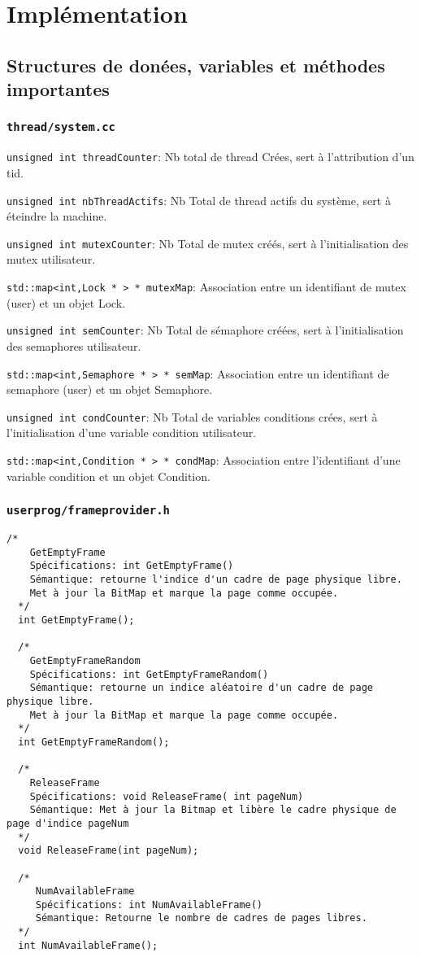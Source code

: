 \documentclass[11pt]{article}
\begin{document}
\section{Implémentation}

\subsection{Structures de donées, variables et méthodes importantes}
\subsubsection{\texttt{thread/system.cc}}

\texttt{unsigned int threadCounter}: Nb total de thread Crées, sert à l'attribution d'un tid.

\texttt{unsigned int nbThreadActifs}: Nb Total de thread actifs du système, sert à éteindre la machine.

\texttt{unsigned int mutexCounter}: Nb Total de mutex créés, sert à l'initialisation des mutex utilisateur.

\texttt{std::map<int,Lock * > * mutexMap}: Association entre un identifiant de mutex (user) et un objet Lock.

\texttt{unsigned int semCounter}: Nb Total de sémaphore créées, sert à l'initialisation des semaphores utilisateur.

\texttt{std::map<int,Semaphore * > * semMap}: Association entre un identifiant de semaphore (user) et un objet Semaphore.

\texttt{unsigned int condCounter}: Nb Total de variables conditions crées, sert à l'initialisation d'une variable
condition utilisateur.

\texttt{std::map<int,Condition * > * condMap}: Association entre l'identifiant d'une variable condition et
un objet Condition.

\subsubsection{\texttt{userprog/frameprovider.h}}
\begin{lstlisting}[columns=fixed,basicstyle=\scriptsize\ttfamily]
/*
    GetEmptyFrame
    Spécifications: int GetEmptyFrame()
    Sémantique: retourne l'indice d'un cadre de page physique libre.
    Met à jour la BitMap et marque la page comme occupée.
  */
  int GetEmptyFrame();

  /*
    GetEmptyFrameRandom
    Spécifications: int GetEmptyFrameRandom()
    Sémantique: retourne un indice aléatoire d'un cadre de page physique libre.
    Met à jour la BitMap et marque la page comme occupée.
  */
  int GetEmptyFrameRandom();

  /*
    ReleaseFrame
    Spécifications: void ReleaseFrame( int pageNum)
    Sémantique: Met à jour la Bitmap et libère le cadre physique de page d'indice pageNum
  */
  void ReleaseFrame(int pageNum);

  /*
     NumAvailableFrame
     Spécifications: int NumAvailableFrame()
     Sémantique: Retourne le nombre de cadres de pages libres.
  */
  int NumAvailableFrame();
\end{lstlisting}
\end{document}
